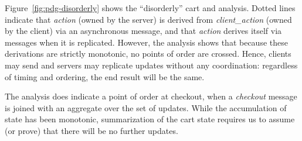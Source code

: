 Figure~\ref{fig:pdg-disorderly} shows the ``disorderly'' cart and analysis.
Dotted lines indicate that 
\emph{action} (owned by the server) is derived from \emph{client\_action} 
(owned by the client) via an asynchronous message, and that \emph{action} 
derives itself via messages when it is replicated.  However, the analysis
shows that because these derivations are strictly monotonic, no points of
order are crossed.  Hence, clients may send and servers may replicate 
updates without any coordination: regardless of timing and ordering, the end
result will be the same.

The analysis does indicate a point of order at checkout, when a \emph{checkout}
message is joined with an aggregate over the set of updates.  While the 
accumulation of state has been monotonic, summarization of the cart state
requires us to assume (or prove) that there will be no further updates.



